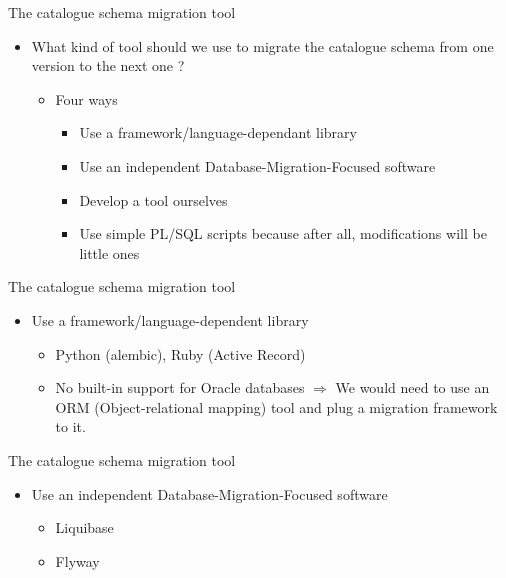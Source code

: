 \documentclass[aspectratio=149]{beamer}
\begin{document}
\begin{frame}{The catalogue schema migration tool}
	\begin{itemize}
		\item What kind of tool should we use to migrate the catalogue schema from one version to the next one ?
		\begin{itemize}
			\item Four ways
			\begin{itemize}
				\item Use a framework/language-dependant library
				\item Use an independent Database-Migration-Focused software
				\item Develop a tool ourselves
				\item Use simple PL/SQL scripts because after all, modifications will be little ones 
			\end{itemize}
		\end{itemize}
	\end{itemize}
\end{frame}

\begin{frame}{The catalogue schema migration tool}
	\begin{itemize}
		\item Use a framework/language-dependent library
		\begin{itemize}
			\item Python (alembic), Ruby (Active Record)
			\item No built-in support for Oracle databases
			$\Rightarrow$ We would need to use an ORM (Object-relational mapping) tool and plug a migration framework to it.
		\end{itemize}
	\end{itemize}
\end{frame}

\begin{frame}{The catalogue schema migration tool}
	\begin{itemize}
		\item Use an independent Database-Migration-Focused software
		\begin{itemize}
			\item Liquibase \href{https://www.liquibase.org/}{}
			\item Flyway \href{https://flywaydb.org/}{}
		\end{itemize}
	\end{itemize}
\end{frame}
\end{document}
